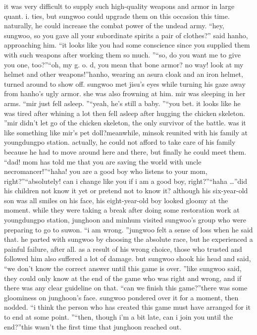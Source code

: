 it was very difficult to supply such high-quality weapons and armor in large quant.
i.
ties, but sungwoo could upgrade them on this occasion this time.
 naturally, he could increase the combat power of the undead army.
“hey, sungwoo, so you gave all your subordinate spirits a pair of clothes?” said hanho, approaching him.
 “it looks like you had some conscience since you supplied them with such weapons after working them so much.
”“so, do you want me to give you one, too?”“oh, my g.
o.
d, you mean that bone armor? no way! look at my helmet and other weapons!”hanho, wearing an asura cloak and an iron helmet, turned around to show off.
sungwoo met jisu's eyes while turning his gaze away from hanho's ugly armor.
 she was also frowning at him.
 mir was sleeping in her arms.
“mir just fell asleep.
”“yeah, he's still a baby.
”“you bet.
 it looks like he was tired after whining a lot then fell asleep after hugging the chicken skeleton.
”mir didn't let go of the chicken skeleton, the only survivor of the battle.
was it like something like mir's pet doll?meanwhile, minsok reunited with his family at youngdungpo station.
 actually, he could not afford to take care of his family because he had to move around here and there, but finally he could meet them.
“dad! mom has told me that you are saving the world with uncle necromancer!”“haha! you are a good boy who listens to your mom, right?”“absolutely! can i change like you if i am a good boy, right?”“haha …”did his children not know it yet or pretend not to know it? although his six-year-old son was all smiles on his face, his eight-year-old boy looked gloomy at the moment.
while they were taking a break after doing some restoration work at youngdungpo station, junghoon and minhum visited sungwoo's group who were preparing to go to suwon.
“i am wrong.
”jungwoo felt a sense of loss when he said that.
 he parted with sungwoo by choosing the absolute race, but he experienced a painful failure, after all.
as a result of his wrong choice, those who trusted and followed him also suffered a lot of damage.
but sungwoo shook his head and said, “we don't know the correct answer until this game is over.
”like sungwoo said, they could only know at the end of the game who was right and wrong, and if there was any clear guideline on that.
“can we finish this game?”there was some gloominess on junghoon's face.
sungwoo pondered over it for a moment, then nodded.
“i think the person who has created this game must have arranged for it to end at some point.
”“then, though i'm a bit late, can i join you until the end?”this wasn't the first time that junghoon reached out.
